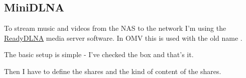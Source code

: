 

\subsection{MiniDLNA}\label{subsec:MiniDLNA}

To stream music and videos from the \gls{NAS} to the network I'm using the
\href{https://sourceforge.net/projects/minidlna/}{ReadyDLNA} media server
software. In \gls{OMV} this is used with the old name .


The basic setup is simple - I've checked the  box and that's
it.


Then I have to define the shares and the kind of content of the shares.


